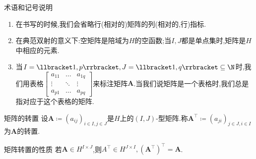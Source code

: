 \begin{remark}{术语和记号说明}{}
	\begin{enumerate}
		\item 在书写的时候,我们会省略行(相对的)矩阵的列(相对的,行)指标.
		\item 在典范双射的意义下:空矩阵是陪域为$H$的空函数;当$I,J$都是单点集时,矩阵是$H$中相应的元素.
		\item 当$I=\llbracket 1,p\rrbracket,J=\llbracket 1,q\rrbracket\subseteq\N$时,我们用表格$\begin{bmatrix}
			a_{11}&\ldots&a_{1q}\\
			\vdots&\ddots&\vdots\\
			a_{p1}&\ldots&a_{pq}
		\end{bmatrix}$来标注矩阵$\boldsymbol{A}$.当我们说矩阵是一个表格时,我们总是指对应于这个表格的矩阵.
	\end{enumerate}
\end{remark}

\begin{definition}{矩阵的转置}{}
	设$\boldsymbol{A}\coloneq\left(a_{ij}\right)_{i\in I,j\in J}$是$H$上的$\left(I,J\right)$-型矩阵.称$\boldsymbol{A}^{\top}\coloneq\left(a_{ji}\right)_{j\in J,i\in I}$为$\boldsymbol{A}$的转置.
\end{definition}

\begin{proposition}{矩阵转置的性质}{}
	若$\boldsymbol{A}\in H^{I\times J}$,则$A^{\top}\in H^{J\times I},\left(\boldsymbol{A}^{\top}\right)^{\top}=\boldsymbol{A}$.
\end{proposition}




















